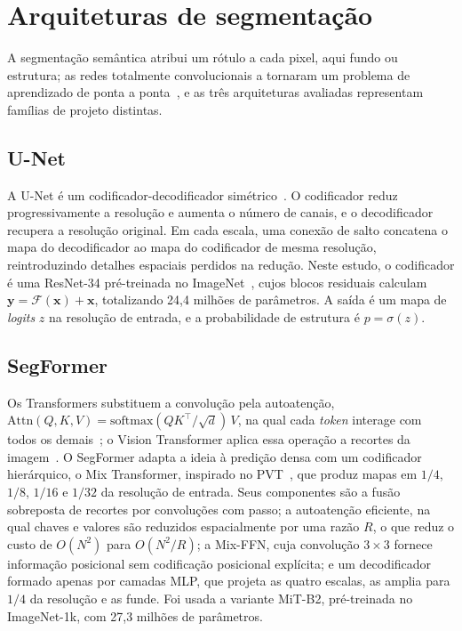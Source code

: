 \documentclass[final,5p,times,twocolumn]{elsarticle}
\begin{document}
\section{Arquiteturas de segmentação}\label{sec:sec3}

A segmentação semântica atribui um rótulo a cada pixel, aqui fundo ou estrutura; as redes totalmente convolucionais a tornaram um problema de aprendizado de ponta a ponta~\cite{long2015fcn}, e as três arquiteturas avaliadas representam famílias de projeto distintas.

\subsection{U-Net}\label{subsec:unet}

A U-Net é um codificador-decodificador simétrico~\cite{ronneberger2015unet}. O codificador reduz progressivamente a resolução e aumenta o número de canais, e o decodificador recupera a resolução original. Em cada escala, uma conexão de salto concatena o mapa do decodificador ao mapa do codificador de mesma resolução, reintroduzindo detalhes espaciais perdidos na redução. Neste estudo, o codificador é uma ResNet-34 pré-treinada no ImageNet~\cite{he2016resnet,deng2009imagenet}, cujos blocos residuais calculam $\mathbf{y}=\mathcal{F}(\mathbf{x})+\mathbf{x}$, totalizando 24,4 milhões de parâmetros. A saída é um mapa de \textit{logits} $z$ na resolução de entrada, e a probabilidade de estrutura é $p=\sigma(z)$.

\subsection{SegFormer}\label{subsec:segformer}

Os Transformers substituem a convolução pela autoatenção, $\mathrm{Attn}(Q,K,V)=\mathrm{softmax}(QK^\top/\sqrt{d})\,V$, na qual cada \textit{token} interage com todos os demais~\cite{vaswani2017}; o Vision Transformer aplica essa operação a recortes da imagem~\cite{dosovitskiy2021vit}. O SegFormer adapta a ideia à predição densa com um codificador hierárquico, o Mix Transformer, inspirado no PVT~\cite{wang2021pvt,xie2021segformer}, que produz mapas em $1/4$, $1/8$, $1/16$ e $1/32$ da resolução de entrada. Seus componentes são a fusão sobreposta de recortes por convoluções com passo; a autoatenção eficiente, na qual chaves e valores são reduzidos espacialmente por uma razão $R$, o que reduz o custo de $O(N^2)$ para $O(N^2/R)$; a Mix-FFN, cuja convolução $3\times3$ fornece informação posicional sem codificação posicional explícita; e um decodificador formado apenas por camadas MLP, que projeta as quatro escalas, as amplia para $1/4$ da resolução e as funde. Foi usada a variante MiT-B2, pré-treinada no ImageNet-1k, com 27,3 milhões de parâmetros.
\end{document}

